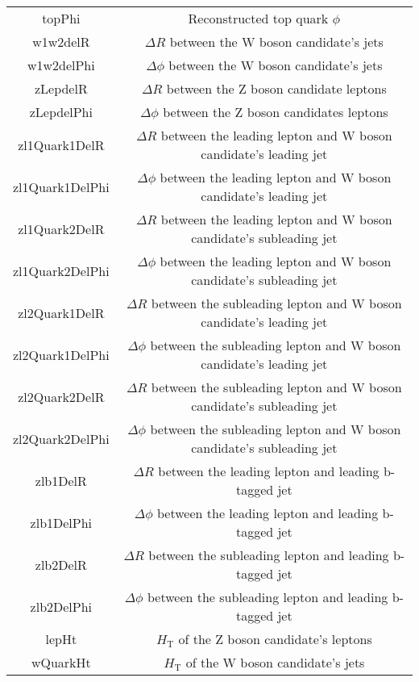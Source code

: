 \begin{table}[htbp]
{\begin{tabular}{cc}
    topPhi & Reconstructed top quark $\phi$ \\
    w1w2delR & $\Delta R$ between the W boson candidate's jets \\
    w1w2delPhi & $\Delta \phi$ between the W boson candidate's jets \\
    zLepdelR & $\Delta R$ between the Z boson candidate leptons \\
    zLepdelPhi & $\Delta \phi$ between the Z boson candidates leptons \\
    zl1Quark1DelR & $\Delta R$ between the leading lepton and W boson candidate's leading jet \\
    zl1Quark1DelPhi & $\Delta \phi$ between the leading lepton and W boson candidate's leading jet \\
    zl1Quark2DelR & $\Delta R$ between the leading lepton and W boson candidate's subleading jet \\
    zl1Quark2DelPhi & $\Delta \phi$ between the leading lepton and W boson candidate's subleading jet \\
    zl2Quark1DelR & $\Delta R$ between the subleading lepton and W boson candidate's leading jet \\
    zl2Quark1DelPhi & $\Delta \phi$ between the subleading lepton and W boson candidate's leading jet \\
    zl2Quark2DelR & $\Delta R$ between the subleading lepton and W boson candidate's subleading jet \\
    zl2Quark2DelPhi & $\Delta \phi$ between the subleading lepton and W boson candidate's subleading jet \\
    zlb1DelR & $\Delta R$ between the leading lepton and leading b-tagged jet \\
    zlb1DelPhi & $\Delta \phi$ between the leading lepton and leading b-tagged jet \\
    zlb2DelR & $\Delta R$ between the subleading lepton and leading b-tagged jet\\
    zlb2DelPhi & $\Delta \phi$ between the subleading lepton and leading b-tagged jet \\
    lepHt & ${\ensuremath{H_{\mathrm{T}}}}$ of the Z boson candidate's leptons \\
    wQuarkHt & ${\ensuremath{H_{\mathrm{T}}}}$ of the W boson candidate's jets \\
   \hline
 \end{tabular}}
\end{table}

